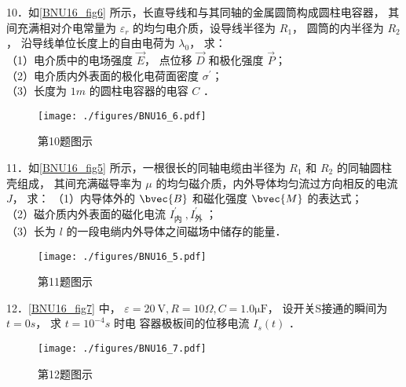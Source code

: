 10．如\autoref{BNU16_fig6} 所示，长直导线和与其同轴的金属圆筒构成圆柱电容器， 其间充满相对介电常量为 $\varepsilon_{r}$ 的均匀电介质，设导线半径为 $R_{1}$， 圆筒的内半径为 $R_{2}$， 沿导线单位长度上的自由电荷为 $\lambda_{0}$， 求：\\
（1）电介质中的电场强度 $\vec{E}$， 点位移 $\vec{D}$ 和极化强度 $\vec{P}$；\\
（2）电介质内外表面的极化电荷面密度 $\sigma^{\prime}$；\\
（3）长度为 $1 m$ 的圆柱电容器的电容 $C$ ．
\begin{figure}[ht]
\centering
\texttt{[image: ./figures/BNU16\_6.pdf]}
\caption{第10题图示} \label{BNU16_fig6}
\end{figure}

11．如\autoref{BNU16_fig5} 所示，一根很长的同轴电缆由半径为 $R_{1}$ 和 $R_{2}$ 的同轴圆柱壳组成， 其间充满磁导率为 $\mu$ 的均匀磁介质，内外导体均匀流过方向相反的电流 $J$， 求：
（1）内导体外的 $\bvec{B}$ 和磁化强度 $\bvec{M}$ 的表达式；\\
（2）磁介质内外表面的磁化电流 $I_{\text {内 }}^{\prime}, I_{\text {外 }}^{\prime}$；\\
（3）长为 $l$ 的一段电绱内外导体之间磁场中储存的能量．
\begin{figure}[ht]
\centering
\texttt{[image: ./figures/BNU16\_5.pdf]}
\caption{第11题图示} \label{BNU16_fig5}
\end{figure}
12．\autoref{BNU16_fig7} 中， $\varepsilon=20 \mathrm{~V}, R=10 \Omega, C=1.0\mathrm{\mu F}$， 设开关S接通的瞬间为 $t=0 s$， 求 $t=10^{-4} s$ 时电 容器极板间的位移电流 $I_{s}(t)$ ．
\begin{figure}[ht]
\centering
\texttt{[image: ./figures/BNU16\_7.pdf]}
\caption{第12题图示} \label{BNU16_fig7}
\end{figure}
